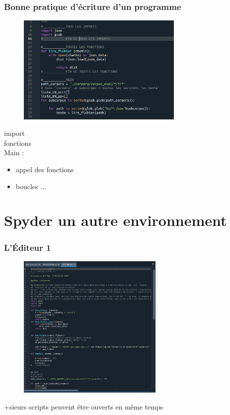 \begin{frame}
  \frametitle{Bonne pratique d'écriture d'un programme}
   \begin{figure}
  \includegraphics[width=8cm]{images/spyder_bonnes_pratiques.png}
  \end{figure}
  
\textcolor{green}{} import \\
\textcolor{green}{} fonctions\\

\textcolor{green}{} Main : 
\vspace{-0.3cm}
\begin{itemize}
\item appel des fonctions
\item boucles ...
\end{itemize}

  
\end{frame}

%  



\section{Spyder un autre environnement }  

\begin{frame} \frametitle{L'Éditeur 1}
  \begin{figure}
  \includegraphics[width=7cm]{images/spyder_editor.png}
  \end{figure}
  
   +sieurs scripts peuvent être ouverts en même temps
\end{frame}

